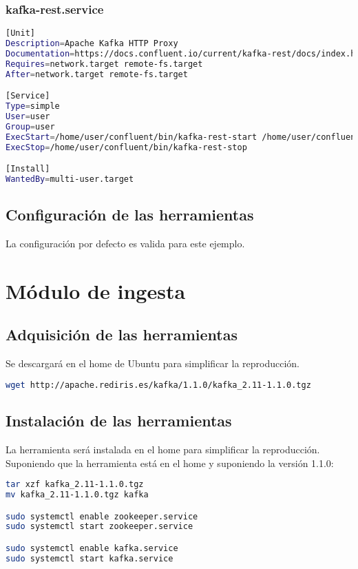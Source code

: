 \subsubsection{kafka-rest.service}
\begin{lstlisting}[language=Bash]
[Unit]
Description=Apache Kafka HTTP Proxy
Documentation=https://docs.confluent.io/current/kafka-rest/docs/index.html
Requires=network.target remote-fs.target
After=network.target remote-fs.target

[Service]
Type=simple
User=user
Group=user
ExecStart=/home/user/confluent/bin/kafka-rest-start /home/user/confluent/etc/kafka-rest/kafka-rest.properties
ExecStop=/home/user/confluent/bin/kafka-rest-stop

[Install]
WantedBy=multi-user.target
\end{lstlisting}

\subsection{Configuración de las herramientas}
La configuración por defecto es valida para este ejemplo.


\section{Módulo de ingesta}
\subsection{Adquisición de las herramientas}
Se descargará en el home de Ubuntu para simplificar la reproducción.
\begin{lstlisting}[language=Bash]
wget http://apache.rediris.es/kafka/1.1.0/kafka_2.11-1.1.0.tgz
\end{lstlisting}

\subsection{Instalación de las herramientas}
La herramienta será instalada en el home para simplificar la reproducción. Suponiendo que la herramienta está en el home y suponiendo la versión 1.1.0:
\begin{lstlisting}[language=Bash]
tar xzf kafka_2.11-1.1.0.tgz
mv kafka_2.11-1.1.0.tgz kafka

sudo systemctl enable zookeeper.service
sudo systemctl start zookeeper.service

sudo systemctl enable kafka.service
sudo systemctl start kafka.service
\end{lstlisting}

